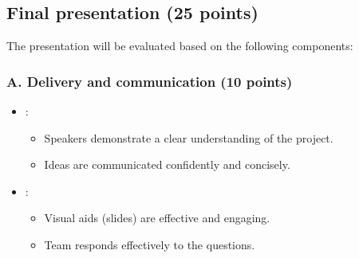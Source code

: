 \documentclass[letterpaper,10pt,english]{jupyterBook}
\begin{document}
\subsection{Final presentation (25 points)}
\label{\detokenize{ProjectSyllabus:id8}}
\sphinxAtStartPar
The presentation will be evaluated based on the following components:


\subsubsection{A. Delivery and communication (10 points)}
\label{\detokenize{ProjectSyllabus:id9}}\begin{itemize}
\item {} 
\sphinxAtStartPar
{}:
\begin{itemize}
\item {} 
\sphinxAtStartPar
Speakers demonstrate a clear understanding of the project.

\item {} 
\sphinxAtStartPar
Ideas are communicated confidently and concisely.

\end{itemize}

\item {} 
\sphinxAtStartPar
{}:
\begin{itemize}
\item {} 
\sphinxAtStartPar
Visual aids (slides) are effective and engaging.

\item {} 
\sphinxAtStartPar
Team responds effectively to the questions.

\end{itemize}

\end{itemize}
\end{document}
